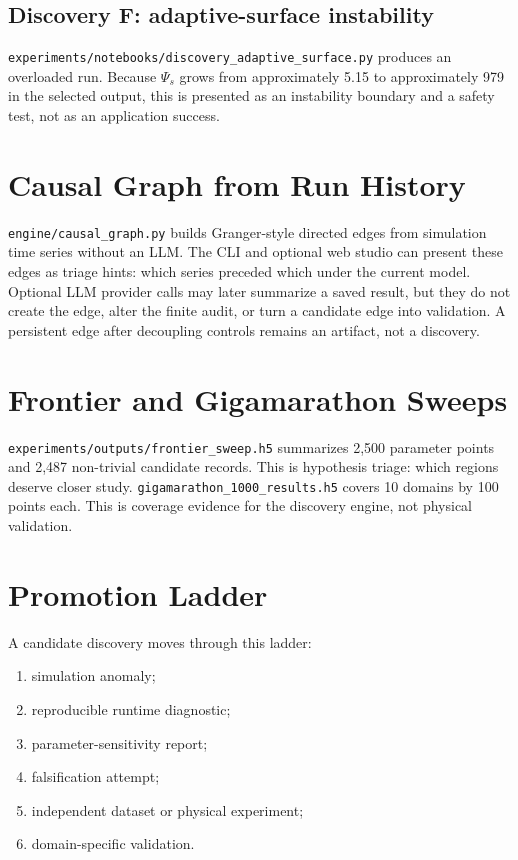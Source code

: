 \documentclass[12pt,a4paper]{article}
\begin{document}
\subsection{Discovery F: adaptive-surface instability}
\texttt{experiments/notebooks/discovery\_adaptive\_surface.py} produces an
overloaded run. Because $\Psi_s$ grows from approximately 5.15 to approximately
979 in the selected output, this is presented as an instability boundary
and a safety test, not as an application success.

\section{Causal Graph from Run History}
\texttt{engine/causal\_graph.py} builds Granger-style directed edges from
simulation time series without an LLM. The CLI and optional web studio can
present these edges as triage hints: which series preceded which under the
current model. Optional LLM provider calls may later summarize a saved result,
but they do not create the edge, alter the finite audit, or turn a candidate
edge into validation. A persistent edge after decoupling controls remains an
artifact, not a discovery.

\section{Frontier and Gigamarathon Sweeps}
\texttt{experiments/outputs/frontier\_sweep.h5} summarizes 2,500 parameter
points and 2,487 non-trivial candidate records. This is hypothesis triage:
which regions deserve closer study. \texttt{gigamarathon\_1000\_results.h5}
covers 10 domains by 100 points each. This is coverage evidence for the
discovery engine, not physical validation.

\section{Promotion Ladder}
A candidate discovery moves through this ladder:
\begin{enumerate}
    \item simulation anomaly;
    \item reproducible runtime diagnostic;
    \item parameter-sensitivity report;
    \item falsification attempt;
    \item independent dataset or physical experiment;
    \item domain-specific validation.
\end{enumerate}
\end{document}
